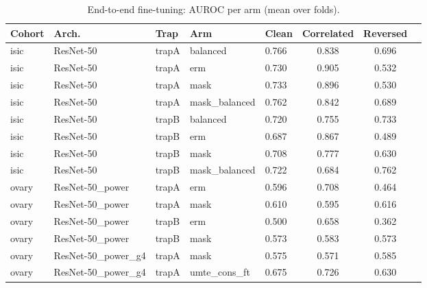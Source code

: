\begin{table}[H]\centering\scriptsize
\caption{End-to-end fine-tuning: AUROC per arm (mean over folds).}\label{tab:ftauc}
\begin{tabular}{lllllccc}\toprule
Cohort & Arch. & Trap & Arm & Clean & Correlated & Reversed \\\midrule
isic & ResNet-50 & trapA & balanced & 0.766 & 0.838 & 0.696 \\
isic & ResNet-50 & trapA & erm & 0.730 & 0.905 & 0.532 \\
isic & ResNet-50 & trapA & mask & 0.733 & 0.896 & 0.530 \\
isic & ResNet-50 & trapA & mask\_balanced & 0.762 & 0.842 & 0.689 \\
isic & ResNet-50 & trapB & balanced & 0.720 & 0.755 & 0.733 \\
isic & ResNet-50 & trapB & erm & 0.687 & 0.867 & 0.489 \\
isic & ResNet-50 & trapB & mask & 0.708 & 0.777 & 0.630 \\
isic & ResNet-50 & trapB & mask\_balanced & 0.722 & 0.684 & 0.762 \\
ovary & ResNet-50\_power & trapA & erm & 0.596 & 0.708 & 0.464 \\
ovary & ResNet-50\_power & trapA & mask & 0.610 & 0.595 & 0.616 \\
ovary & ResNet-50\_power & trapB & erm & 0.500 & 0.658 & 0.362 \\
ovary & ResNet-50\_power & trapB & mask & 0.573 & 0.583 & 0.573 \\
ovary & ResNet-50\_power\_g4 & trapA & mask & 0.575 & 0.571 & 0.585 \\
ovary & ResNet-50\_power\_g4 & trapA & umte\_cons\_ft & 0.675 & 0.726 & 0.630 \\
\bottomrule\end{tabular}\end{table}
